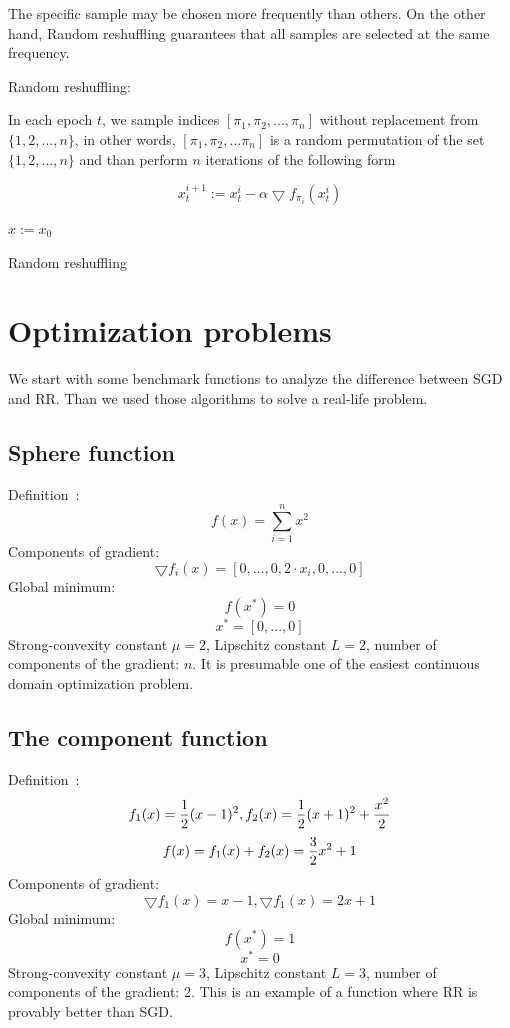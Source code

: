 \documentclass[10pt,conference,compsocconf]{IEEEtran}
\begin{document}
\noindent The specific sample may be chosen more frequently than others. On the
other hand, Random reshuffling guarantees that all samples are selected at
the same frequency.

\medskip

\noindent Random reshuffling:

\noindent In each epoch $t$, we sample indices $[\pi_1, \pi_2,..., \pi_n]$
without replacement from $\{1, 2,..., n\}$, in other words,
$[\pi_1, \pi_2,...\pi_n]$ is a random permutation of the
set $\{1, 2,..., n\}$ and than perform $n$ iterations of the following
form

$$x_t^{i+1} := x_t^i - \alpha \bigtriangledown f_{\pi_i}(x_t^i)$$

\begin{algorithm}
\SetAlgoLined

  $x:= x_0$ \\
 
 \caption{Random reshuffling}
\end{algorithm}



\section{Optimization problems}

We start with some benchmark functions to analyze the difference between
SGD and RR. Than we used those algorithms to solve a real-life problem.

\subsection{Sphere function}

\noindent Definition~\cite{SPHERE}:
$$f(x) = \sum_{i=1}^n x^2$$
Components of gradient:
$$\bigtriangledown f_i(x) = [0,...,0,2\cdot x_i,0,...,0]$$
Global minimum:
$$f(x^*) = 0$$
$$x^* = [0,...,0]$$
Strong-convexity constant $\mu = 2$, Lipschitz constant \mbox{$L=2$},
number of components of the gradient: $n$. It is presumable one of
the easiest continuous domain optimization problem.

\subsection{The component function}
\noindent Definition~\cite{COMPONENTFUNCTION}:
$$f_1(x) = {1 \over 2}(x-1)^2, f_2(x) = {1 \over 2}(x+1)^2 + {x^2 \over 2}$$
$$f(x) = f_1(x) + f_2(x) = {3 \over 2} x^2 + 1$$
Components of gradient:
$$\bigtriangledown f_1(x) = x - 1, \bigtriangledown f_1(x) = 2x + 1$$
Global minimum:
$$f(x^*) = 1$$
$$x^* = 0$$
Strong-convexity constant $\mu = 3$, Lipschitz constant \mbox{$L=3$},
number of components of the gradient: 2. This is an example of a function where RR is provably better than SGD. \cite{COMPONENTFUNCTION}
\end{document}
